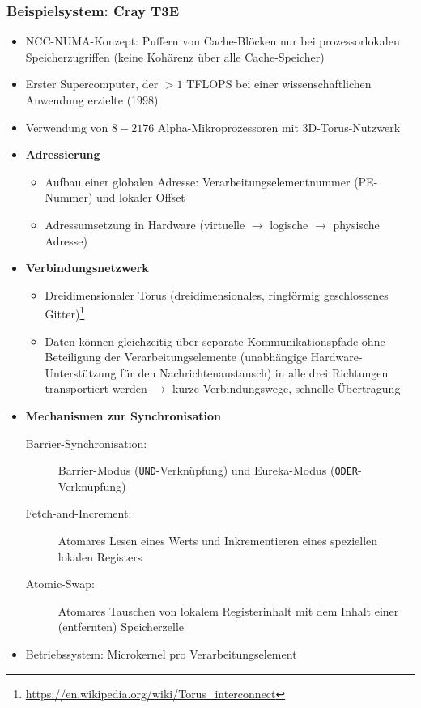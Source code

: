 \subsubsection{Beispielsystem: Cray T3E}
\begin{itemize}
	\item NCC-NUMA-Konzept: Puffern von Cache-Blöcken nur bei prozessorlokalen Speicherzugriffen (keine Kohärenz über alle Cache-Speicher)
	\item Erster Supercomputer, der \(>1\) TFLOPS bei einer wissenschaftlichen Anwendung erzielte (1998)
	\item Verwendung von \(8-2176\) Alpha-Mikroprozessoren mit 3D-Torus-Nutzwerk
	\item \textbf{Adressierung}
	\begin{itemize}
		\item Aufbau einer globalen Adresse: Verarbeitungselementnummer (PE-Nummer) und lokaler Offset
		\item Adressumsetzung in Hardware (virtuelle \(\rightarrow\) logische \(\rightarrow\) physische Adresse)
	\end{itemize}
	\item \textbf{Verbindungsnetzwerk}
	\begin{itemize}
		\item Dreidimensionaler Torus (dreidimensionales, ringförmig geschlossenes Gitter)\footnote{\url{https://en.wikipedia.org/wiki/Torus_interconnect}}
		\item Daten können gleichzeitig über separate Kommunikationspfade ohne Beteiligung der Verarbeitungselemente (unabhängige Hardware-Unterstützung für den Nachrichtenaustausch) in alle drei Richtungen transportiert werden \(\rightarrow\) kurze Verbindungswege, schnelle Übertragung
	\end{itemize}
	\item \textbf{Mechanismen zur Synchronisation}
	\begin{description}
		\item[Barrier-Synchronisation:] Barrier-Modus (\texttt{UND}-Verknüpfung) und Eureka-Modus (\texttt{ODER}-Verknüpfung)
		\item[Fetch-and-Increment:] Atomares Lesen eines Werts und Inkrementieren eines speziellen lokalen Registers
		\item[Atomic-Swap:] Atomares Tauschen von lokalem Registerinhalt mit dem Inhalt einer (entfernten) Speicherzelle
	\end{description}
	\item Betriebssystem: Microkernel pro Verarbeitungselement
\end{itemize}


